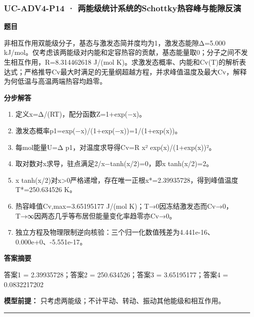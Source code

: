 \documentclass[UTF8,11pt,a4paper]{ctexart}
\begin{document}
\subsubsection*{UC-ADV4-P14 · 两能级统计系统的Schottky热容峰与能隙反演}
\noindent\textbf{题目}\par
非相互作用双能级分子，基态与激发态简并度均为1，激发态能隙Δ=5.000 kJ/mol。仅考虑该两能级对内能和定容热容的贡献，基态能量取0；分子之间不发生相互作用，R=8.314462618 J/(mol K)。求激发态概率、内能和Cv(T)的解析表达式；严格推导Cv最大时满足的无量纲超越方程，并求峰值温度及最大Cv，解释为何低温与高温两端热容均趋零。\par
\medskip\noindent\textbf{分步解答}
\begin{enumerate}
\item 定义x=Δ/(RT)，配分函数Z=1+exp(−x)。
\item 激发态概率p1=exp(−x)/(1+exp(−x))=1/(1+exp(x))。
\item 每mol能量U=Δ p1，对温度求导得Cv=R x² exp(x)/(1+exp(x))²。
\item 取对数对x求导，驻点满足2/x−tanh(x/2)=0，即x tanh(x/2)=2。
\item x tanh(x/2)对x>0严格递增，存在唯一正根x*=2.39935728，得到峰值温度T*=250.634526 K。
\item 热容峰值Cv,max=3.65195177 J/(mol K)；T→0因冻结激发态而Cv→0，T→∞因两态几乎等布居但能量变化率趋零亦Cv→0。
\item 独立方程及物理限制逆向核验：三个归一化数值残差为4.441e-16、0.000e+0、-5.551e-17。
\end{enumerate}
\noindent\textbf{答案摘要}\par
答案1 = 2.39935728；答案2 = 250.634526；答案3 = 3.65195177；答案4 = 0.0832217202\par
\noindent\textbf{模型前提：}
只考虑两能级；不计平动、转动、振动其他能级和相互作用。\par
\medskip\hrule\medskip
{}
\end{document}
